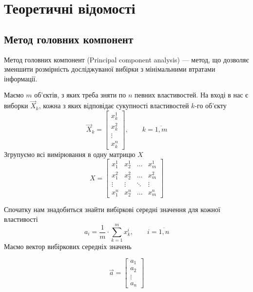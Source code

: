 \section{Теоретичні відомості}
\subsection{Метод головних компонент}
Метод головних компонент (Principal component analysis) --- метод, що дозволяє
зменшити розмірність досліджуваної вибірки з мінімальними втратами інформації.
\cite{Aivazyan:1989}

Маємо $m$ об’єктів, з яких треба зняти по $n$ певних властивостей.
На вході в нас є виборки $\vec{X}_k$, кожна з яких відповідає сукупності
властивостей $k$-го об’єкту
\begin{equation*}
  \vec{X}_k = \begin{bmatrix}
    x_k^1  \\
    x_k^2  \\
    \vdots \\
    x_k^n
  \end{bmatrix},
  \qquad k = \overline{1,m}
\end{equation*}
Згрупуємо всі вимірювання в одну матрицю $X$
\begin{equation*}
  X = \begin{bmatrix}
    x_1^1  & x_2^1  & \dots  & x_m^1  \\
    x_1^2  & x_2^2  & \dots  & x_m^2  \\
    \vdots & \vdots & \ddots & \vdots \\
    x_1^n  & x_2^n  & \dots  & x_m^n
  \end{bmatrix}
\end{equation*}

Спочатку нам знадобиться знайти вибіркові середні значення для кожної
властивості
\begin{equation*}
  a_i = \frac{1}{m} \cdot \sum_{k=1}^{m} x_k^i, \qquad i = \overline{1,n}
\end{equation*}
Маємо вектор вибіркових середніх значень
\begin{comment}
\begin{equation*}
  \vec{a} = \begin{bmatrix}
    \frac{1}{m} \sum_{k=1}^{m} x_k^1 \\
    \frac{1}{m} \sum_{k=1}^{m} x_k^2 \\
    \vdots                           \\
    \frac{1}{m} \sum_{k=1}^{m} x_k^n \\
  \end{bmatrix}
\end{equation*}
\end{comment}
\begin{equation*}
  \vec{a} = \begin{bmatrix}
    a_1    \\
    a_2    \\
    \vdots \\
    a_n
  \end{bmatrix}
\end{equation*}

